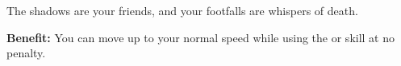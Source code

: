 
The shadows are your friends, and your footfalls are whispers of death.

\textbf{Benefit:} You can move up to your normal speed while using the  or  skill at no penalty.